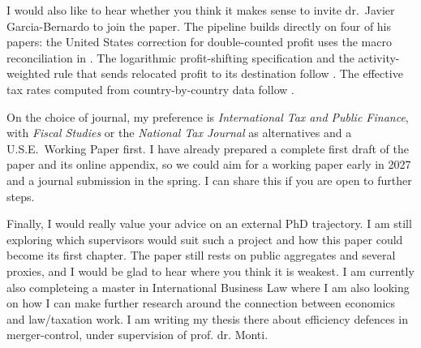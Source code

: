 \documentclass[11pt,a4paper]{article}
\begin{document}
I would also like to hear whether you think it makes sense to invite dr.\ Javier Garcia-Bernardo to join the paper. The pipeline builds directly on four of his papers: the United States correction for double-counted profit uses the macro reconciliation in \citet{garcia-bernardo2022a}. The logarithmic profit-shifting specification and the activity-weighted rule that sends relocated profit to its destination follow \citet{garcia-bernardo2024}. The effective tax rates computed from country-by-country data follow \citet{garcia-bernardo2021,garcia-bernardo2023}. 

On the choice of journal, my preference is \emph{International Tax and Public Finance}, with \emph{Fiscal Studies} or the \emph{National Tax Journal} as alternatives and a U.S.E.\ Working Paper first. I have already prepared a complete first draft of the paper and its online appendix, so we could aim for a working paper early in 2027 and a journal submission in the spring. I can share this if you are open to further steps. 

Finally, I would really value your advice on an external PhD trajectory. I am still exploring which supervisors would suit such a project and how this paper could become its first chapter. The paper still rests on public aggregates and several proxies, and I would be glad to hear where you think it is weakest. I am currently also completeing a master in International Business Law where I am also looking on how I can make further research around the connection between economics and law/taxation work. I am writing my thesis there about efficiency defences in merger-control, under supervision of prof. dr. Monti. 
\end{document}
